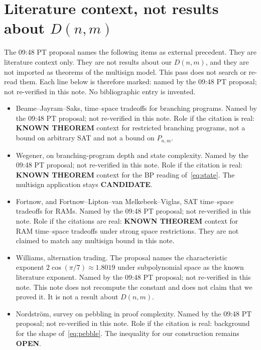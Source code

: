 \documentclass[11pt]{article}
\begin{document}
\section{Literature context, not results about \(D(n,m)\)}
The 09:48 PT proposal names the following items as external precedent.
They are literature context only.
They are not results about our \(D(n,m)\), and they are not imported as theorems of the multisign model.
This pass does not search or re-read them.
Each line below is therefore marked: named by the 09:48 PT proposal; not re-verified in this note.
No bibliographic entry is invented.

\begin{itemize}
\item Beame--Jayram--Saks, time--space tradeoffs for branching programs.
Named by the 09:48 PT proposal; not re-verified in this note.
Role if the citation is real: \textbf{KNOWN THEOREM} context for restricted branching programs, not a bound on arbitrary SAT and not a bound on \(P_{n,m}\).

\item Wegener, on branching-program depth and state complexity.
Named by the 09:48 PT proposal; not re-verified in this note.
Role if the citation is real: \textbf{KNOWN THEOREM} context for the BP reading of~\eqref{eq:state}.
The multisign application stays \textbf{CANDIDATE}.

\item Fortnow, and Fortnow--Lipton--van Melkebeek--Viglas, SAT time--space tradeoffs for RAMs.
Named by the 09:48 PT proposal; not re-verified in this note.
Role if the citations are real: \textbf{KNOWN THEOREM} context for RAM time--space tradeoffs under strong space restrictions.
They are not claimed to match any multisign bound in this note.

\item Williams, alternation trading.
The proposal names the characteristic exponent \(2\cos(\pi/7)\approx 1.8019\) under subpolynomial space as the known literature exponent.
Named by the 09:48 PT proposal; not re-verified in this note.
This note does not recompute the constant and does not claim that we proved it.
It is not a result about \(D(n,m)\).

\item Nordstr\"om, survey on pebbling in proof complexity.
Named by the 09:48 PT proposal; not re-verified in this note.
Role if the citation is real: background for the shape of~\eqref{eq:pebble}.
The inequality for our construction remains \textbf{OPEN}.


\end{itemize}
\end{document}
